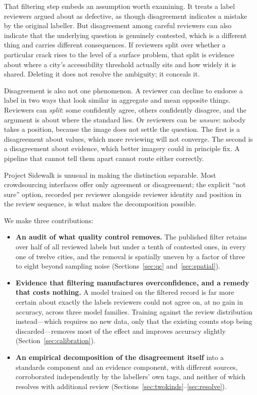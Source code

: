 \documentclass[sigconf]{acmart}
\begin{document}
That filtering step embeds an assumption worth examining. It treats a label
reviewers argued about as defective, as though disagreement indicates a mistake
by the original labeller. But disagreement among careful reviewers can also
indicate that the underlying question is genuinely contested, which is a
different thing and carries different consequences. If reviewers split over
whether a particular crack rises to the level of a surface problem, that split
is evidence about where a city's accessibility threshold actually sits and how
widely it is shared. Deleting it does not resolve the ambiguity; it conceals it.

Disagreement is also not one phenomenon. A reviewer can decline to endorse a
label in two ways that look similar in aggregate and mean opposite things.
Reviewers can \emph{split}: some confidently agree, others confidently
disagree, and the argument is about where the standard lies. Or reviewers can be
\emph{unsure}: nobody takes a position, because the image does not settle the
question. The first is a disagreement about values, which more reviewing will
not converge. The second is a disagreement about evidence, which better imagery
could in principle fix. A pipeline that cannot tell them apart cannot route
either correctly.

Project Sidewalk is unusual in making the distinction separable. Most
crowdsourcing interfaces offer only agreement or disagreement; the explicit
``not sure'' option, recorded per reviewer alongside reviewer identity and
position in the review sequence, is what makes the decomposition possible.

We make three contributions:

\begin{itemize}
\setlength\itemsep{0.15em}
\item \textbf{An audit of what quality control removes.} The published filter
  retains over half of all reviewed labels but under a tenth of contested ones,
  in every one of twelve cities, and the removal is spatially uneven by a
  factor of three to eight beyond sampling noise
  (Sections~\ref{sec:qc} and~\ref{sec:spatial}).
\item \textbf{Evidence that filtering manufactures overconfidence, and a
  remedy that costs nothing.} A model trained on the filtered record is far
  more certain about exactly the labels reviewers could not agree on, at no
  gain in accuracy, across three model families. Training against the review
  distribution instead---which requires no new data, only that the existing
  counts stop being discarded---removes most of the effect and improves
  accuracy slightly (Section~\ref{sec:calibration}).
\item \textbf{An empirical decomposition of the disagreement itself} into a
  standards component and an evidence component, with different sources,
  corroborated independently by the labellers' own tags, and neither of which
  resolves with additional review (Sections~\ref{sec:twokinds}--\ref{sec:resolve}).
\end{itemize}
\end{document}
